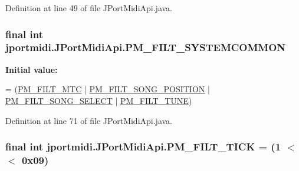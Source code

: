 Definition at line 49 of file J\+Port\+Midi\+Api.\+java.

\subsubsection[{\texorpdfstring{P\+M\+\_\+\+F\+I\+L\+T\+\_\+\+S\+Y\+S\+T\+E\+M\+C\+O\+M\+M\+ON}{PM_FILT_SYSTEMCOMMON}}]{\setlength{\rightskip}{0pt plus 5cm}final {\bf int} jportmidi.\+J\+Port\+Midi\+Api.\+P\+M\+\_\+\+F\+I\+L\+T\+\_\+\+S\+Y\+S\+T\+E\+M\+C\+O\+M\+M\+ON\hspace{0.3cm}{\ttfamily [static]}}\hypertarget{classjportmidi_1_1_j_port_midi_api_ad9e43233900fff9c9dc20dac9f5e45d9}{}\label{classjportmidi_1_1_j_port_midi_api_ad9e43233900fff9c9dc20dac9f5e45d9}
{\bfseries Initial value\+:}
\begin{DoxyCode}
=
        (\hyperlink{classjportmidi_1_1_j_port_midi_api_a33f04e9c4975dbf77745300850fed838}{PM\_FILT\_MTC} | \hyperlink{classjportmidi_1_1_j_port_midi_api_a44570b5ed5fa9136061e974c17fdb6b4}{PM\_FILT\_SONG\_POSITION} | 
         \hyperlink{classjportmidi_1_1_j_port_midi_api_a492ba21b711bb71813900d0c7848f6b3}{PM\_FILT\_SONG\_SELECT} | \hyperlink{classjportmidi_1_1_j_port_midi_api_a3918de1cdc8c20a370eadd5c0fec51d1}{PM\_FILT\_TUNE})
\end{DoxyCode}


Definition at line 71 of file J\+Port\+Midi\+Api.\+java.

\subsubsection[{\texorpdfstring{P\+M\+\_\+\+F\+I\+L\+T\+\_\+\+T\+I\+CK}{PM_FILT_TICK}}]{\setlength{\rightskip}{0pt plus 5cm}final {\bf int} jportmidi.\+J\+Port\+Midi\+Api.\+P\+M\+\_\+\+F\+I\+L\+T\+\_\+\+T\+I\+CK = (1 $<$$<$ 0x09)\hspace{0.3cm}{\ttfamily [static]}}\hypertarget{classjportmidi_1_1_j_port_midi_api_a1371a1b8f29785a4a5b8c3a112854ef5}{}\label{classjportmidi_1_1_j_port_midi_api_a1371a1b8f29785a4a5b8c3a112854ef5}


